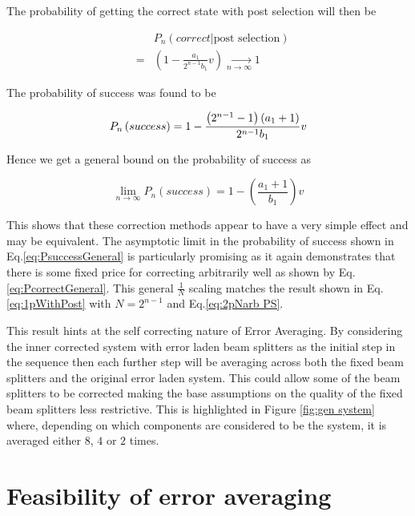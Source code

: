 \documentclass[aps,pra,twocolumn,superscriptaddress,numerical]{revtex4-1}
\begin{document}
		The probability of getting the correct state with post selection will then be
			
		\begin{eqnarray}
			&  & P_{n}\left(correct\left|\textrm{post selection}\right.\right)\nonumber \\
			& = & \left(1-\frac{a_{1}}{2^{n-1}b_{1}}v\right)\xrightarrow[n\rightarrow\infty]{}1\label{eq:PcorrectGeneral}
		\end{eqnarray}
				
		The probability of success was found to be
			
		\begin{equation}
			P_{n}\left(success\right) =  1-\frac{\left(2^{n-1}-1\right)\left(a_{1}+1\right)}{2^{n-1}b_{1}}v\nonumber \\
		\end{equation}
			
		Hence we get a general bound on the probability of success as
			
		\begin{equation}
			\lim_{n\rightarrow\infty}P_{n}\left(success\right)=1-\left(\frac{a_{1}+1}{b_{1}}\right)v\label{eq:PsuccessGeneral}
		\end{equation}	
			
		This shows that these correction methods appear to have a very simple effect and may be equivalent. The asymptotic limit in the probability	of success shown in Eq.\ref{eq:PsuccessGeneral} is particularly promising as it again demonstrates that there is some fixed price for correcting arbitrarily well as shown by Eq.\ref{eq:PcorrectGeneral}. This general $\frac{1}{N}$ scaling matches the result shown in Eq.\ref{eq:1pWithPost} with $N=2^{n-1}$ and Eq.\ref{eq:2pNarb PS}.
			
		This result hints at the self correcting nature of Error Averaging. By considering the inner corrected system with error laden beam splitters as the initial step in the sequence then each further step will be averaging across both the fixed beam splitters and the original error laden system. This could allow some of the beam splitters to be corrected  making the base assumptions on the quality of the fixed beam splitters less restrictive. This is highlighted in Figure \ref{fig:gen system} where, depending on which components are considered to be the system, it is averaged either $8$, $4$ or $2$ times. 

\section{Feasibility of error averaging\label{Feasibility section}}
\end{document}
